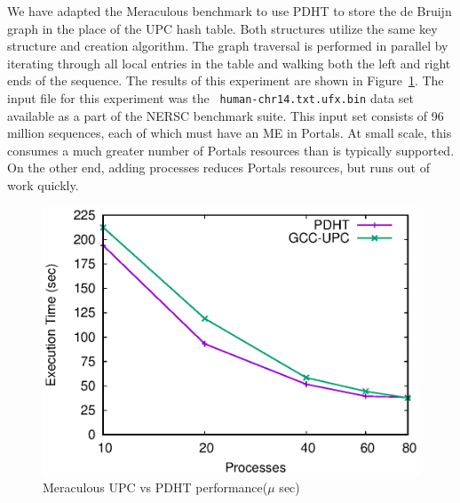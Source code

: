 We have adapted the Meraculous benchmark to use PDHT to store the de Bruijn
graph in the place of the UPC hash table. Both structures utilize the same key
structure and creation algorithm. The graph traversal is performed in parallel
by iterating through all local entries in the table and walking both the left
and right ends of the sequence. The results of this experiment are shown in
Figure~\ref{fig:meraculous}. The input file for this experiment was the {\tt
  human-chr14.txt.ufx.bin} data set available as a part of the NERSC benchmark
suite. This input set consists of 96 million sequences, each of which must have
an ME in Portals. At small scale, this consumes a much greater number of
Portals resources than is typically supported. On the other end, adding 
processes reduces Portals resources, but runs out of work quickly.

\begin{figure}
  \centering
  \includegraphics[width=.9\linewidth]{plots/meraculous}
  \caption{Meraculous UPC vs PDHT performance($\mu$ sec)}
  \label{fig:meraculous}
\end{figure}


